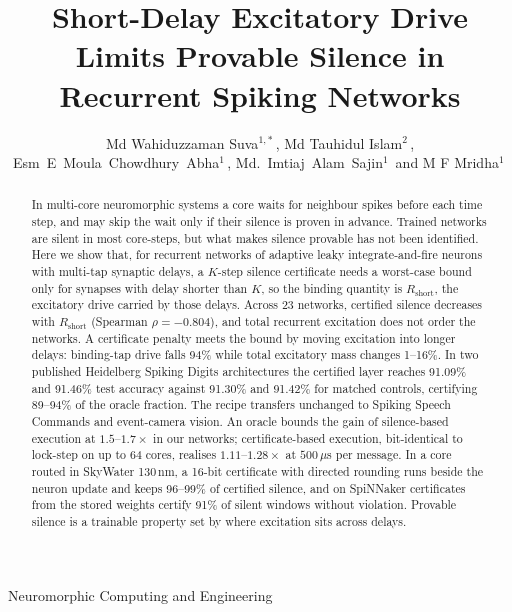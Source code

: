 \documentclass{iopjournal}
\renewcommand{\articletype}[1]{{\vspace*{-8mm}\noindent \Large \sf Neuromorphic Computing and Engineering}\par
\vspace*{8mm}\noindent{\scriptsize \sf{\bfseries \MakeUppercase{#1}}}}
\begin{document}
\articletype{Paper}

\title{Short-Delay Excitatory Drive Limits Provable Silence in Recurrent Spiking Networks}

\author{Md Wahiduzzaman Suva$^{1,*}$\,, Md Tauhidul Islam$^{2}$\,, Esm~E~Moula~Chowdhury~Abha$^{1}$\,, Md.~Imtiaj~Alam~Sajin$^{1}$\, and M F Mridha$^{1}$\,}






\begin{abstract}
In multi-core neuromorphic systems a core waits for neighbour spikes before each time step, and may skip the wait only if their silence is proven in advance. Trained networks are silent in most core-steps, but what makes silence provable has not been identified. Here we show that, for recurrent networks of adaptive leaky integrate-and-fire neurons with multi-tap synaptic delays, a $K$-step silence certificate needs a worst-case bound only for synapses with delay shorter than $K$, so the binding quantity is $R_{\mathrm{short}}$, the excitatory drive carried by those delays. Across 23 networks, certified silence decreases with $R_{\mathrm{short}}$ (Spearman $\rho=-0.804$), and total recurrent excitation does not order the networks. A certificate penalty meets the bound by moving excitation into longer delays: binding-tap drive falls 94\% while total excitatory mass changes 1--16\%. In two published Heidelberg Spiking Digits architectures the certified layer reaches 91.09\% and 91.46\% test accuracy against 91.30\% and 91.42\% for matched controls, certifying 89--94\% of the oracle fraction. The recipe transfers unchanged to Spiking Speech Commands and event-camera vision. An oracle bounds the gain of silence-based execution at $1.5$--$1.7\times$ in our networks; certificate-based execution, bit-identical to lock-step on up to 64 cores, realises $1.11$--$1.28\times$ at $500\,\mu$s per message. In a core routed in SkyWater 130\,nm, a 16-bit certificate with directed rounding runs beside the neuron update and keeps 96--99\% of certified silence, and on SpiNNaker certificates from the stored weights certify 91\% of silent windows without violation. Provable silence is a trainable property set by where excitation sits across delays.
\end{abstract}
\end{document}
